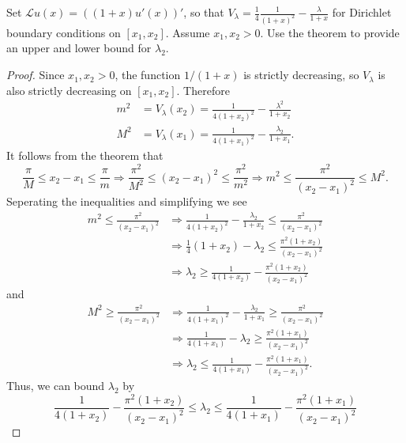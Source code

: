 \documentclass{exam}
\begin{document}
\begin{questions}
        \question Set $\mathcal{L}u(x) = ((1+x)u'(x))'$, so that $V_\lambda = \frac{1}{4}\frac{1}{(1+x)^2} - \frac{\lambda}{1+x}$ for Dirichlet boundary conditions on $[x_1, x_2]$. Assume $x_1, x_2 > 0$. Use the theorem to provide an upper and lower bound for $\lambda_2$.
        \begin{solution}
            \begin{proof}
                Since $x_1, x_2 > 0$, the function $1/(1+x)$ is strictly decreasing, so $V_\lambda$ is also strictly decreasing on $[x_1, x_2]$. Therefore 
                \begin{align*}
                    m^2 &= V_\lambda(x_2) = \frac{1}{4(1+x_2)^2} - \frac{\lambda^2}{1+x_2} \\
                    M^2 &= V_\lambda(x_1) = \frac{1}{4(1+x_1)^2} - \frac{\lambda_2}{1+x_1}.
                \end{align*}
                It follows from the theorem that 
                \[
                    \frac{\pi}{M} \leq x_2 - x_1 \leq \frac{\pi}{m} \Rightarrow \frac{\pi^2}{M^2} \leq (x_2 - x_1)^2 \leq \frac{\pi^2}{m^2} \Rightarrow m^2 \leq \frac{\pi^2}{(x_2 - x_1)^2} \leq M^2.
                \]
                Seperating the inequalities and simplifying we see 
                \begin{align*}
                    m^2 \leq \frac{\pi^2}{(x_2 - x_1)^2} &\Rightarrow \frac{1}{4(1 + x_2)^2} - \frac{\lambda_2}{1+x_2} \leq \frac{\pi^2}{(x_2 - x_1)^2} \\
                    &\Rightarrow \frac{1}{4}(1+x_2) - \lambda_2 \leq \frac{\pi^2(1+x_2)}{(x_2 - x_1)^2} \\
                    &\Rightarrow \lambda_2 \geq \frac{1}{4(1+x_2)} - \frac{\pi^2(1+x_2)}{(x_2 - x_1)^2}
                \end{align*}
                and 
                \begin{align*}
                    M^2 \geq \frac{\pi^2}{(x_2 - x_1)^2} &\Rightarrow \frac{1}{4(1+x_1)^2} - \frac{\lambda_2}{1 + x_1} \geq \frac{\pi^2}{(x_2 - x_1)^2} \\
                    &\Rightarrow \frac{1}{4(1+x_1)} - \lambda_2 \geq \frac{\pi^2(1+x_1)}{(x_2 - x_1)^2} \\
                    &\Rightarrow \lambda_2 \leq \frac{1}{4(1+x_1)} - \frac{\pi^2(1+x_1)}{(x_2 - x_1)^2}.
                \end{align*}
                Thus, we can bound $\lambda_2$ by 
                \[
                    \frac{1}{4(1+x_2)} - \frac{\pi^2(1+x_2)}{(x_2 - x_1)^2} \leq \lambda_2 \leq \frac{1}{4(1+x_1)} - \frac{\pi^2(1+x_1)}{(x_2 - x_1)^2}
                \]
            \end{proof}
        \end{solution}
    \end{questions}
\end{document}
